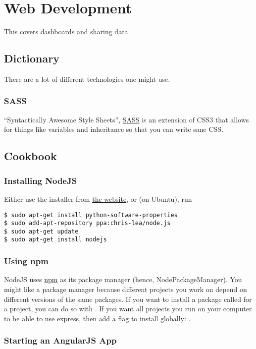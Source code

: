 \chapter{Web Development}
This covers dashboards and sharing data.
\section{Dictionary}
There are a lot of different technologies one might use.

\subsection{SASS}

``Syntactically Awesome Style Sheets'', \href{http://sass-lang.com/}{SASS} is an
extension of CSS3 that allows for things like variables and inheritance so that
you can write sane CSS.

\section{Cookbook}

\subsection{Installing NodeJS}\label{subsec:install_nodejs}
Either use the installer from \href{http://nodejs.org/}{the website}, or (on Ubuntu), run
\begin{lstlisting}[style=bash]
$ sudo apt-get install python-software-properties
$ sudo add-apt-repository ppa:chris-lea/node.js
$ sudo apt-get update
$ sudo apt-get install nodejs
\end{lstlisting}

\subsection{Using npm}
NodeJS uses \href{https://www.npmjs.org/}{npm} as its package manager
(hence, NodePackageManager). You might like a package manager because
different projects you work on depend on different versions of the same
packages.  If you want to install a package called  for a project,
you can do so with .  If you want all projects you
run on your computer to be able to use express, then add a  flag
to install globally: . 

\subsection{Starting an AngularJS App}

